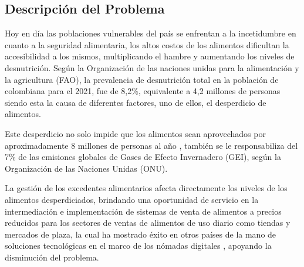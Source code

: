 \subsection{Descripción del Problema}
Hoy en día las poblaciones vulnerables del país se enfrentan a la incetidumbre en cuanto a la seguridad alimentaria, los altos costos de los alimentos dificultan la accesibilidad a los mismos, multiplicando el hambre y aumentando los niveles de desnutrición. Según la Organización de las naciones unidas para la alimentación y la agricultura (FAO), la prevalencia de desnutrición total en la población de colombiana para el 2021, fue de 8,2\%, equivalente a 4,2 millones de personas \cite{FAO} siendo esta la causa de diferentes factores, uno de ellos, el desperdicio de alimentos.

Este desperdicio no solo impide que los alimentos sean aprovechados por aproximadamente 8 millones de personas al año \cite{DNP}, también se le responsabiliza del 7\% de las emisiones globales de Gases de Efecto Invernadero (GEI), según la Organización de las Naciones Unidas (ONU)\cite{MADS}.

La gestión de los excedentes alimentarios afecta directamente los niveles de los alimentos desperdiciados, brindando una oportunidad de servicio en la intermediación e implementación de sistemas de venta de alimentos a precios reducidos para los sectores de ventas de alimentos de uso diario como tiendas y mercados de plaza, la cual ha mostrado éxito en otros países de la mano de soluciones tecnológicas en el marco de los nómadas digitales \cite{Soup}, apoyando la disminución  del problema.

